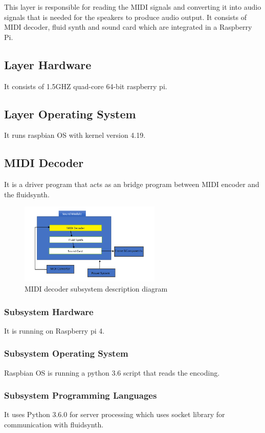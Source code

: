 This layer is responsible for reading the MIDI signals and converting it into audio signals that is needed for the speakers to produce audio output. It consists of MIDI decoder, fluid synth and sound card which are integrated in a Raspberry Pi.

\subsection{Layer Hardware}
It consists of 1.5GHZ quad-core 64-bit raspberry pi.

\subsection{Layer Operating System}
It runs raspbian OS with kernel version 4.19.

\subsection{MIDI Decoder}
It is a driver program that acts as an bridge program between MIDI encoder and the fluidsynth.

\begin{figure}[h!]
	\centering
 	\includegraphics[width=0.60\textwidth]{images/decoder.png}
 \caption{MIDI decoder subsystem description diagram}
\end{figure}

\subsubsection{Subsystem Hardware}
It is running on Raspberry pi 4.

\subsubsection{Subsystem Operating System}
Raspbian OS is running a python 3.6 script that reads the encoding.

\subsubsection{Subsystem Programming Languages}
It uses Python 3.6.0 for server processing which uses socket library for communication with fluidsynth. 

